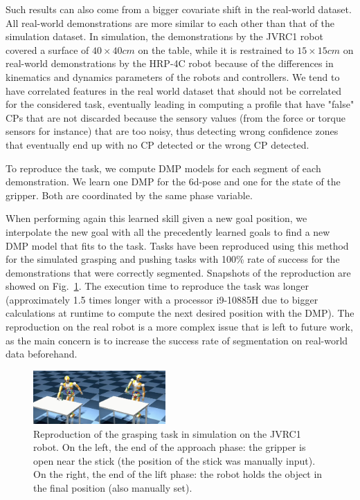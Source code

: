 \documentclass[a4paper, 10pt, conference]{ieeeconf}
\begin{document}
Such results can also come from a bigger covariate shift in the real-world dataset. All real-world demonstrations are more similar to each other than that of the simulation dataset. In simulation, the demonstrations by the JVRC1 robot covered a surface of $40 \times 40 cm$ on the table, while it is restrained to $15 \times 15 cm$ on real-world demonstrations by the HRP-4C robot because of the differences in kinematics and dynamics parameters of the robots and controllers. We tend to have correlated features in the real world dataset that should not be correlated for the considered task, eventually leading in computing a profile that have "false" CPs that are not discarded because the sensory values (from the force or torque sensors for instance) that are too noisy, thus detecting wrong confidence zones that eventually end up with no CP detected or the wrong CP detected. 

To reproduce the task, we compute DMP models for each segment of each demonstration. We learn one DMP for the 6d-pose and one for the state of the gripper. Both are coordinated by the same phase variable.

When performing again this learned skill given a new goal position, we interpolate the new goal with all the precedently learned goals to find a new DMP model that fits to the task. Tasks have been reproduced using this method for the simulated grasping and pushing tasks with 100\% rate of success for the demonstrations that were correctly segmented. Snapshots of the reproduction are showed on Fig.~\ref{fig:reproductionSim}. The execution time to reproduce the task was longer (approximately 1.5 times longer with a processor i9-10885H due to bigger calculations at runtime to compute the next desired position with the DMP). The reproduction on the real robot is a more complex issue that is left to future work, as the main concern is to increase the success rate of segmentation on real-world data beforehand.

\begin{figure}[t]
  \centering
  \includegraphics[width=0.45\textwidth]{img/Reproduction.png}
  \caption{Reproduction of the grasping task in simulation on the JVRC1 robot. On the left, the end of the approach phase: the gripper is open near the stick (the position of the stick was manually input). On the right, the end of the lift phase: the robot holds the object in the final position (also manually set).}
  \label{fig:reproductionSim}
\end{figure}
\end{document}
